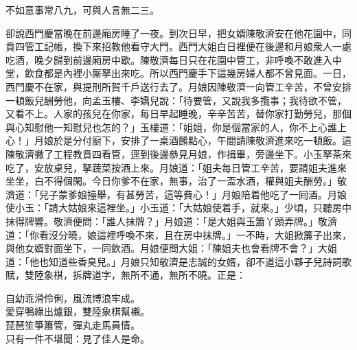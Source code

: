 \begin{myquote}
不如意事常八九，可與人言無二三。
\end{myquote}

卻說西門慶當晚在前邊廂房睡了一夜。到次日早，把女婿陳敬濟安在他花園中，同賁四管工記帳，換下來招教他看守大門。西門大姐白日裡便在後邊和月娘衆人一處吃酒，晚夕歸到前邊廂房中歇。陳敬濟每日只在花園中管工，非呼喚不敢進入中堂，飲食都是內裡小厮拏出來吃。所以西門慶手下這幾房婦人都不曾見面。一日，西門慶不在家，與提刑所賀千戶送行去了。月娘因陳敬濟一向管工辛苦，不曾安排一頓飯兒酬勞他，向孟玉樓、李嬌兒說：「待要管，又說我多攬事；我待欲不管，又看不上。{}人家的孩兒在你家，每日早起睡晚，辛辛苦苦，替你家打勤勞兒，那個與心知慰他一知慰兒也怎的？」玉樓道：「姐姐，你是個當家的人，你不上心誰上心！」月娘於是分付廚下，安排了一桌酒餚點心，午間請陳敬濟進來吃一頓飯。這陳敬濟撇了工程教賁四看管，逕到後邊叅見月娘，作揖畢，旁邊坐下。小玉拏茶來吃了，安放桌兒，拏蔬菜按酒上來。月娘道：「姐夫每日管工辛苦，要請姐夫進來坐坐，白不得個閑。今日你爹不在家，無事，治了一盃水酒，權與姐夫酬勞。」敬濟道：「兒子蒙爹娘擡舉，有甚勞苦，這等費心！」月娘陪着他吃了一囘酒。月娘使小玉：「請大姑娘來這裡坐。」小玉道：「大姑娘使着手，就來。」少頃，只聽房中抹得牌響。敬濟便問：「誰人抹牌？」月娘道：「是大姐與玉簫丫頭弄牌。」敬濟道：「你看沒分曉，娘這裡呼喚不來，且在房中抹牌。」一不時，大姐掀簾子出來，與他女婿對面坐下，一同飲酒。月娘便問大姐：「陳姐夫也會看牌不會？」大姐道：「他也知道些香臭兒。」{}月娘只知敬濟是志誠的女婿，卻不道這小夥子兒詩詞歌賦，{}雙陸象棋，拆牌道字，無所不通，無所不曉。正是：

\begin{myquote}
自幼乖滑伶俐，風流博浪牢成。\\愛穿鴨綠出爐銀，雙陸象棋幫襯。\\琵琶笙箏簫管，彈丸走馬員情。\\只有一件不堪聞：見了佳人是命。
\end{myquote}

